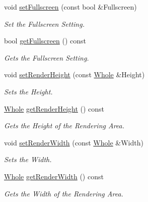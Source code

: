 \begin{DoxyCompactItemize}
void \hyperlink{classphys_1_1GameWindow_a3c710c93a4fca54b5249de09bd4335dc}{setFullscreen} (const bool \&Fullscreen)
\begin{DoxyCompactList}\small\item\em Set the Fullscreen Setting. \item\end{DoxyCompactList}\item 
bool \hyperlink{classphys_1_1GameWindow_a05ab7d5525e73f5eecf1f6ef6d3598ab}{getFullscreen} () const 
\begin{DoxyCompactList}\small\item\em Gets the Fullscreen Setting. \item\end{DoxyCompactList}\item 
void \hyperlink{classphys_1_1GameWindow_a92e705ba782ff87dacd9ce487141fcab}{setRenderHeight} (const \hyperlink{namespacephys_a460f6bc24c8dd347b05e0366ae34f34a}{Whole} \&Height)
\begin{DoxyCompactList}\small\item\em Sets the Height. \item\end{DoxyCompactList}\item 
\hyperlink{namespacephys_a460f6bc24c8dd347b05e0366ae34f34a}{Whole} \hyperlink{classphys_1_1GameWindow_a9c4d207a8889453ac5f35e7925fd13ef}{getRenderHeight} () const 
\begin{DoxyCompactList}\small\item\em Gets the Height of the Rendering Area. \item\end{DoxyCompactList}\item 
void \hyperlink{classphys_1_1GameWindow_a4a6087112f5a958d153fc74bc03897ba}{setRenderWidth} (const \hyperlink{namespacephys_a460f6bc24c8dd347b05e0366ae34f34a}{Whole} \&Width)
\begin{DoxyCompactList}\small\item\em Sets the Width. \item\end{DoxyCompactList}\item 
\hyperlink{namespacephys_a460f6bc24c8dd347b05e0366ae34f34a}{Whole} \hyperlink{classphys_1_1GameWindow_a77e2ec6f64b7a7d1229aca32de57c872}{getRenderWidth} () const 
\begin{DoxyCompactList}\small\item\em Gets the Width of the Rendering Area. \item\end{DoxyCompactList}\item 

\end{DoxyCompactItemize}
